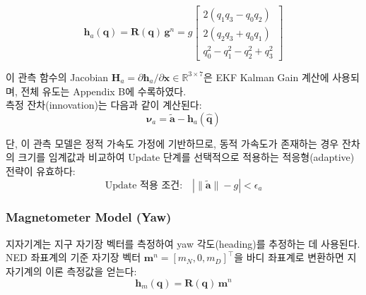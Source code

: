             \begin{equation}
                \mathbf{h}_a(\mathbf{q}) = \mathbf{R}(\mathbf{q})\, \mathbf{g}^n = g \begin{bmatrix}
                    2(q_1 q_3 - q_0 q_2) \\
                    2(q_2 q_3 + q_0 q_1) \\
                    q_0^2 - q_1^2 - q_2^2 + q_3^2
                \end{bmatrix}
                \label{eq:accel_obs_model}
            \end{equation}

            이 관측 함수의 Jacobian $\mathbf{H}_a = \partial \mathbf{h}_a / \partial \mathbf{x} \in \mathbb{R}^{3\times 7}$은 EKF Kalman Gain 계산에 사용되며, 전체 유도는 Appendix B에 수록하였다.\\

            측정 잔차(innovation)는 다음과 같이 계산된다:\\

            \begin{equation}
                \boldsymbol{\nu}_a = \tilde{\mathbf{a}} - \mathbf{h}_a(\hat{\mathbf{q}})
                \label{eq:accel_innovation}
            \end{equation}

            단, 이 관측 모델은 정적 가속도 가정에 기반하므로, 동적 가속도가 존재하는 경우 잔차의 크기를 임계값과 비교하여 Update 단계를 선택적으로 적용하는 적응형(adaptive) 전략이 유효하다:\\

            \begin{equation}
                \text{Update 적용 조건:} \quad \left| \|\tilde{\mathbf{a}}\| - g \right| < \epsilon_a
                \label{eq:accel_update_condition}
            \end{equation}

        \subsubsection{Magnetometer Model (Yaw)}
            지자기계는 지구 자기장 벡터를 측정하여 yaw 각도(heading)를 추정하는 데 사용된다. NED 좌표계의 기준 자기장 벡터 $\mathbf{m}^n = [m_N, 0, m_D]^\top$을 바디 좌표계로 변환하면 지자기계의 이론 측정값을 얻는다:\\

            \begin{equation}
                \mathbf{h}_m(\mathbf{q}) = \mathbf{R}(\mathbf{q})\, \mathbf{m}^n
                \label{eq:mag_obs_model}
            \end{equation}

